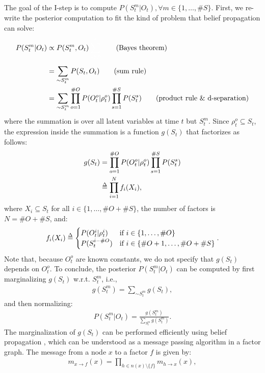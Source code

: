 \documentclass[twoside,11pt]{article}
\def\delequal{\mathrel{\ensurestackMath{\stackon[1pt]{=}{\scriptstyle\Delta}}}}
\newcommand{\nb}[1]{\# #1}
\begin{document}
The goal of the I-step is to compute $P(S_t^m|O_t), \forall m \in \{1, \hdots, \nb{S}\}$. First, we re-write the posterior computation to fit the kind of problem that belief propagation can solve:
\begin{align*}
P(S_t^m|O_t) &\propto P(S^m_t, O_t){\color{white}\sum_{\sim S^m_t}^T} \tag{Bayes theorem}\\
&= \sum_{\sim S^m_t}^{{\color{white}}} P(S_t, O_t) \tag{sum rule}\\
&= \sum_{\sim S^m_t} \prod_{o=1}^{\nb{O}} P(O_t^o|\rho_t^o)\prod_{s=1}^{\nb{S}} P(S_t^s) \tag{product rule \& d-separation}\\
\end{align*}
where the summation is over all latent variables at time $t$ but $S^m_t$. Since $\rho_t^o \subseteq S_t$, the expression inside the summation is a function $g(S_t)$ that factorizes as follows:
\begin{align*}
g(S_t) &= \prod_{o=1}^{\nb{O}} P(O_t^o|\rho_t^o) \prod_{s=1}^{\nb{S}} P(S_t^s)\\
&\delequal \prod_{i=1}^{N} f_i(X_i),
\end{align*}
where $X_i \subseteq S_t$ for all $i \in \{1, \hdots, \nb{O} + \nb{S}\}$, the number of factors is $N = \nb{O}+\nb{S}$, and:
\begin{align*}
f_i(X_i) \delequal \begin{cases}
	P(O_t^i|\rho_t^i) & \text{if } i \in \{1, \hdots, \nb{O}\}\\
	P(S_t^{i - \nb{O}}) & \text{if } i \in \{\nb{O} + 1, \hdots, \nb{O}+\nb{S}\}\\
\end{cases}.
\end{align*}
Note that, because $O_t^o$ are known constants, we do not specify that $g(S_t)$ depends on $O_t^o$. To conclude, the posterior $P(S_t^m|O_t)$ can be computed by first marginalizing $g(S_t)$ w.r.t. $S_t^m$, i.e.,
\begin{align*}
g(S_t^m) = \sum_{\sim S^m_t} g(S_t),
\end{align*}
and then normalizing:
\begin{align*}
P(S_t^m|O_t) = \frac{g(S_t^m)}{\sum_{S^m_t} g(S^m_t)}.
\end{align*}
The marginalization of $g(S_t)$ can be performed efficiently using belief propagation \citep{belief_propagation}, which can be understood as a message passing algorithm in a factor graph. The message from a node $x$ to a factor $f$ is given by:
\begin{align*}
m_{x \rightarrow f}(x) = \prod_{h \in n(x) \setminus \{f\}} m_{h \rightarrow x}(x),
\end{align*}
\end{document}
